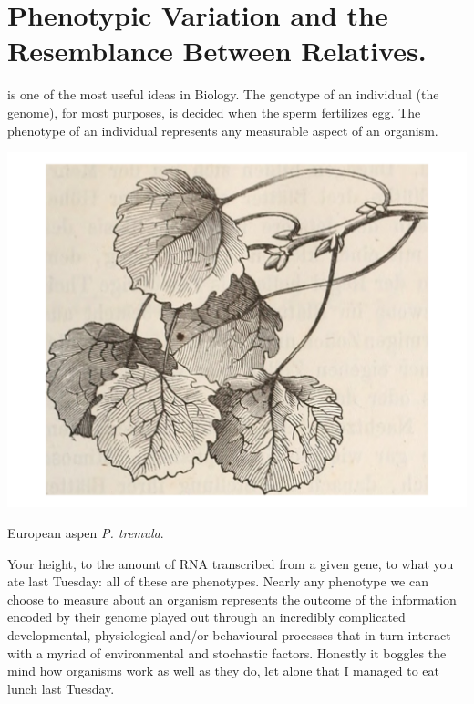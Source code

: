 \chapter{Phenotypic Variation and the Resemblance Between Relatives.}

 is one of the most useful ideas in Biology.\cite{Johannsen:1911} 
The genotype of an individual (the genome), for most purposes, is decided when
the sperm fertilizes egg. The phenotype of an individual represents any
measurable aspect of an organism. \begin{marginfigure}
\begin{center}
\includegraphics[width=0.8 \textwidth]{illustration_images/Quant_gen/Aspen_budset/Aspen_leaves.pdf}
\end{center}
\caption{European aspen {\it P. tremula}.  } \label{fig:Apsen_geno_pheno}
\end{marginfigure}   Your height, to the amount of
RNA transcribed from a given gene, to what you ate last Tuesday: all
of these are phenotypes.  Nearly any phenotype we can choose to measure about an organism represents the outcome of the information encoded by their genome played out through an incredibly complicated
developmental, physiological and/or behavioural processes that in turn interact with a myriad of environmental and
stochastic factors. Honestly it boggles the mind how organisms work as well as they do, let alone that I managed to eat lunch last Tuesday. 

